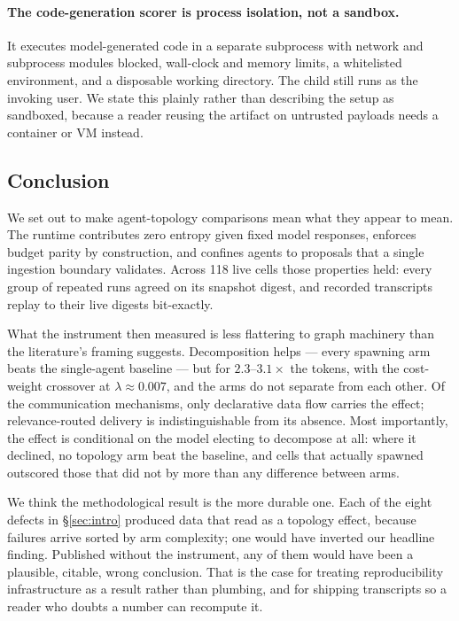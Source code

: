 \documentclass[10pt]{article}
\begin{document}
\paragraph{The code-generation scorer is process isolation, not a sandbox.}
It executes model-generated code in a separate subprocess with network and
subprocess modules blocked, wall-clock and memory limits, a whitelisted
environment, and a disposable working directory. The child still runs as the
invoking user. We state this plainly rather than describing the setup as
sandboxed, because a reader reusing the artifact on untrusted payloads needs a
container or VM instead.

\subsection*{Conclusion}

We set out to make agent-topology comparisons mean what they appear to mean. The
runtime contributes zero entropy given fixed model responses, enforces budget
parity by construction, and confines agents to proposals that a single ingestion
boundary validates. Across 118 live cells those properties held: every group of
repeated runs agreed on its snapshot digest, and recorded transcripts replay to
their live digests bit-exactly.

What the instrument then measured is less flattering to graph machinery than the
literature's framing suggests. Decomposition helps --- every spawning arm beats
the single-agent baseline --- but for $2.3$--$3.1\times$ the tokens, with the
cost-weight crossover at $\lambda \approx 0.007$, and the arms do not separate
from each other. Of the communication mechanisms, only declarative data flow
carries the effect; relevance-routed delivery is indistinguishable from its
absence. Most importantly, the effect is conditional on the model electing to
decompose at all: where it declined, no topology arm beat the baseline, and
cells that actually spawned outscored those that did not by more than any
difference between arms.

We think the methodological result is the more durable one. Each of the eight
defects in §\ref{sec:intro} produced data that read as a topology effect,
because failures arrive sorted by arm complexity; one would have inverted our
headline finding. Published without the instrument, any of them would have been
a plausible, citable, wrong conclusion. That is the case for treating
reproducibility infrastructure as a result rather than plumbing, and for
shipping transcripts so a reader who doubts a number can recompute it.
\end{document}
